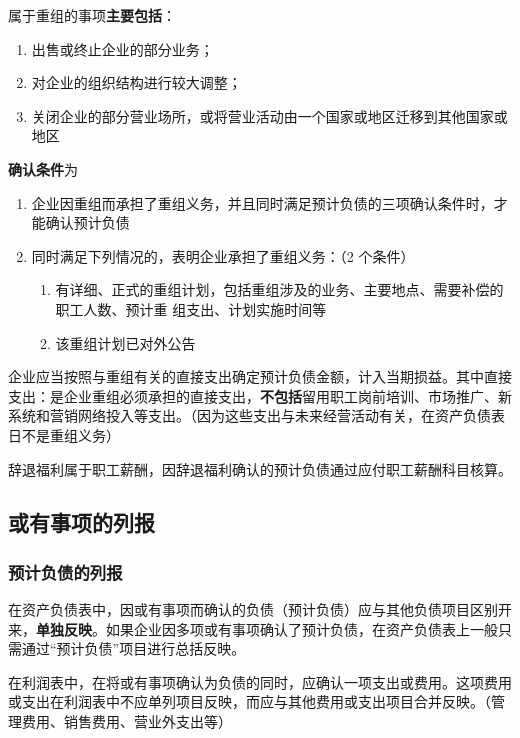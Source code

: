 \documentclass[UTF8,12pt]{ctexart}
\numberwithin{equation}{section} %
\numberwithin{figure}{section}
\numberwithin{table}{section}
\begin{document}
	属于重组的事项\textbf{主要包括}：
	\begin{enumerate}
		\item 出售或终止企业的部分业务；
		
		\item 对企业的组织结构进行较大调整；
		
		\item 关闭企业的部分营业场所，或将营业活动由一个国家或地区迁移到其他国家或地区
	\end{enumerate}
	
	
	\textbf{确认条件}为
	\begin{enumerate}
		\item 企业因重组而承担了重组义务，并且同时满足预计负债的三项确认条件时，才能确认预计负债
		
		\item 同时满足下列情况的，表明企业承担了重组义务：（2 个条件）
		\begin{enumerate}
			\item 有详细、正式的重组计划，包括重组涉及的业务、主要地点、需要补偿的职工人数、预计重   组支出、计划实施时间等
			
			\item 该重组计划已对外公告
		\end{enumerate}
		
	\end{enumerate}

	企业应当按照与重组有关的直接支出确定预计负债金额，计入当期损益。其中直接支出：是企业重组必须承担的直接支出，\textbf{不包括}留用职工岗前培训、市场推广、新系统和营销网络投入等支出。（因为这些支出与未来经营活动有关，在资产负债表日不是重组义务）
	
	辞退福利属于职工薪酬，因辞退福利确认的预计负债通过应付职工薪酬科目核算。
	
	
	\subsection{或有事项的列报}
	\subsubsection{预计负债的列报}
	在资产负债表中，因或有事项而确认的负债（预计负债）应与其他负债项目区别开来，\textbf{单独反映}。如果企业因多项或有事项确认了预计负债，在资产负债表上一般只需通过“预计负债”项目进行总括反映。
	
	在利润表中，在将或有事项确认为负债的同时，应确认一项支出或费用。这项费用或支出在利润表中不应单列项目反映，而应与其他费用或支出项目合并反映。（管理费用、销售费用、营业外支出等）
	
\end{document}
